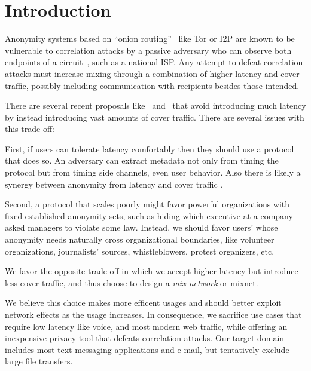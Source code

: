 
\section{Introduction}

Anonymity systems based on ``onion routing''~\cite{SS03} like Tor or
I2P are known to be vulnerable to correlation attacks by a passive
adversary who can observe both endpoints of a
circuit~\cite{timing-fc2004}, such as a national ISP.  Any attempt to
defeat correlation attacks must increase mixing through a combination
of higher latency and cover traffic, possibly including communication
with recipients besides those intended.

There are several recent proposals like~\cite{Alpenhorn}
and~\cite{Dissent} that avoid introducing much latency by instead
introducing vast amounts of cover traffic.  There are several issues
with this trade off: 


First, if users can tolerate latency comfortably then they should
use a protocol that does so.  An adversary can extract metadata not
only from timing the protocol but from timing side channels, even
user behavior.  Also there is likely a synergy between anonymity from
latency and cover traffic \cite{??}.

Second, a protocol that scales poorly might favor powerful
organizations with fixed established anonymity sets, such as hiding
which executive at a company asked managers to violate some law.
Instead, we should favor users' whose anonymity needs naturally
cross organizational boundaries, like volunteer organizations,
journalists' sources, whistleblowers, protest organizers, etc.

We favor the opposite trade off in which we accept higher latency but
introduce less cover traffic, and thus choose to design a
{\em mix network} or mixnet.  %

We believe this choice makes more efficent usages and should better
exploit network effects as the usage increases.  
In consequence, we sacrifice use cases that require low latency like
voice, and most modern web traffic, while offering an inexpensive
privacy tool that defeats correlation attacks.
Our target domain includes most text messaging applications and
e-mail, but tentatively exclude large file transfers. 

